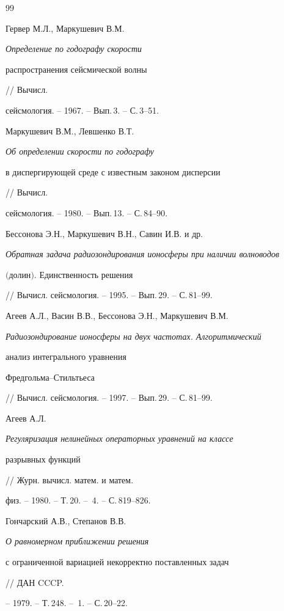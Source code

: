 \begin{thebibliography}{99}







Гервер М.Л., Маркушевич В.М. {\em Определение по годографу скорости


распространения сейсмической волны} // Вычисл.


сейсмология. -- 1967. -- Вып.\,3. -- С.\,3--51.




Маркушевич В.М., Левшенко В.Т. {\em Об определении скорости по годографу


в диспергирующей среде с известным законом дисперсии} // Вычисл.


сейсмология. -- 1980. -- Вып.\,13. -- С.\,84--90.




Бессонова Э.Н., Маркушевич В.Н., Савин И.В. и др.


{\em Обратная задача радиозондирования ионосферы при наличии волноводов


$($долин$)$. Единственность решения}


// Вычисл. сейсмология. -- 1995. -- Вып.\,29. -- С.\,81--99.




Агеев А.Л., Васин В.В., Бессонова Э.Н., Маркушевич В.М.


{\em Радиозондирование ионосферы на двух частотах. Алгоритмический


анализ интегрального уравнения


Фредгольма--Стильтьеса}


// Вычисл. сейсмология. -- 1997. -- Вып.\,29. -- С.\,81--99.




Агеев А.Л. {\em Регуляризация нелинейных операторных уравнений на классе


разрывных функций} // Журн. вычисл. матем. и матем. 


физ. -- 1980. -- Т.\,20. -- \No\,4. -- С.\,819--826.




Гончарский А.В., Степанов В.В. {\em О равномерном приближении решения


с ограниченной вариацией некорректно поставленных задач} // ДАН CCCP.


-- 1979. -- Т.\,248. -- \No\,1. -- С.\,20--22.





\end{thebibliography}
